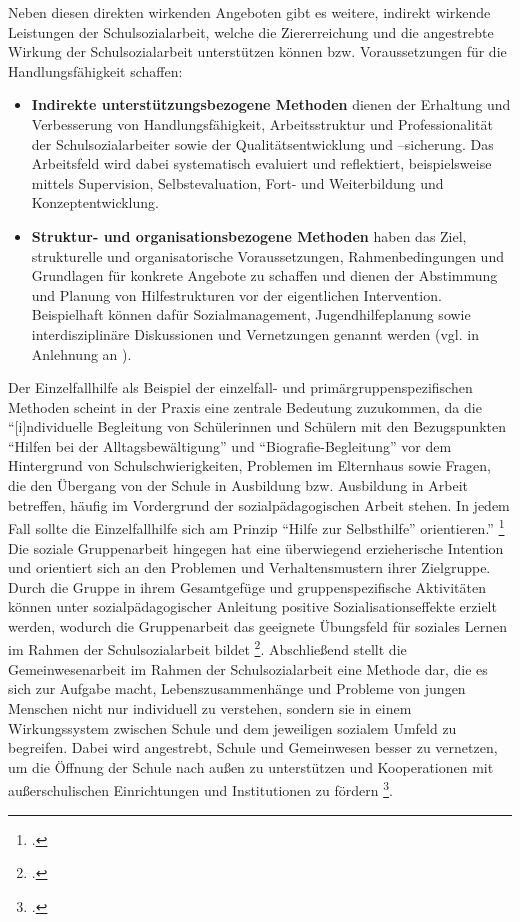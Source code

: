 \noindent
Neben diesen direkten wirkenden Angeboten gibt es weitere, indirekt wirkende Leistungen der Schulsozialarbeit, welche die Ziererreichung und die angestrebte Wirkung der Schulsozialarbeit unterstützen können bzw. Voraussetzungen für die Handlungsfähigkeit schaffen:
\begin{itemize}
	\item \textbf{Indirekte unterstützungsbezogene Methoden} dienen der Erhaltung und Verbesserung von Handlungsfähigkeit, Arbeitsstruktur und Professionalität der Schulsozialarbeiter sowie der Qualitätsentwicklung und –sicherung. Das Arbeitsfeld wird dabei systematisch evaluiert und reflektiert, beispielsweise mittels Supervision, Selbstevaluation, Fort- und Weiterbildung und Konzeptentwicklung. 
	\item \textbf{Struktur- und organisationsbezogene Methoden} haben das Ziel, strukturelle und organisatorische Voraussetzungen, Rahmenbedingungen und Grundlagen für konkrete Angebote zu schaffen und dienen der Abstimmung und Planung von Hilfestrukturen vor der eigentlichen Intervention. Beispielhaft können dafür Sozialmanagement, Jugendhilfeplanung sowie interdisziplinäre Diskussionen und Vernetzungen genannt werden (vgl. \cite[vgl.][96ff]{Stuewe2015} in Anlehnung an \cite[64f]{Speck2007}).
\end{itemize}

\noindent 
Der Einzelfallhilfe als Beispiel der einzelfall- und primärgruppenspezifischen Methoden scheint in der Praxis eine zentrale Bedeutung zuzukommen, da die "`[i]ndividuelle Begleitung von Schülerinnen und Schülern mit den Bezugspunkten "`Hilfen bei der Alltagsbewältigung"' und "`Biografie-Begleitung"' vor dem Hintergrund von Schulschwierigkeiten, Problemen im Elternhaus sowie Fragen, die den Übergang von der Schule in Ausbildung bzw. Ausbildung in Arbeit betreffen, häufig im Vordergrund der sozialpädagogischen Arbeit stehen. In jedem Fall sollte die Einzelfallhilfe sich am Prinzip "`Hilfe zur Selbsthilfe"' orientieren."' \footcite[23]{SMSSS2009} Die soziale Gruppenarbeit hingegen hat eine überwiegend erzieherische Intention und orientiert sich an den Problemen und Verhaltensmustern ihrer Zielgruppe. Durch die Gruppe in ihrem Gesamtgefüge und gruppenspezifische Aktivitäten können unter sozialpädagogischer Anleitung positive Sozialisationseffekte erzielt werden, wodurch die Gruppenarbeit das geeignete Übungsfeld für soziales Lernen im Rahmen der Schulsozialarbeit bildet \footcite[vgl.][24]{SMSSS2009}. Abschließend stellt die Gemeinwesenarbeit im Rahmen der Schulsozialarbeit eine Methode dar, die es sich zur Aufgabe macht, Lebenszusammenhänge und Probleme von jungen Menschen nicht nur individuell zu verstehen, sondern sie in einem Wirkungssystem zwischen Schule und dem jeweiligen sozialem Umfeld zu begreifen. Dabei wird angestrebt, Schule und Gemeinwesen besser zu vernetzen, um die Öffnung der Schule nach außen zu unterstützen und Kooperationen mit außerschulischen Einrichtungen und Institutionen zu fördern \footcite[vgl.][25]{SMSSS2009}. 

